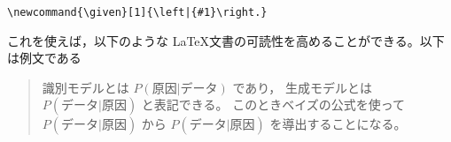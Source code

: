 ﻿\documentclass[uplatex,10pt,a4paper]{jsarticle}
\newcommand{\of}[1]{\left(#1\right)}
\newcommand{\given}[1]{\left|{#1}\right.}
\begin{document}
\verb,\newcommand{\given}[1]{\left|{#1}\right.},


これを使えば，以下のような \LaTeX 文書の可読性を高めることができる。以下は例文である

\begin{quotation}
識別モデルとは $P\of{\mbox{原因}\given{\mbox{データ}}}$ であり，
  生成モデルとは $P\of{\mbox{データ}\given{原因}}$ と表記できる。
  このときベイズの公式を使って $P\of{\mbox{データ}\given{原因}}$ から
  $P\of{\mbox{データ}\given{原因}}$ を導出することになる。
\end{quotation}
\end{document}
